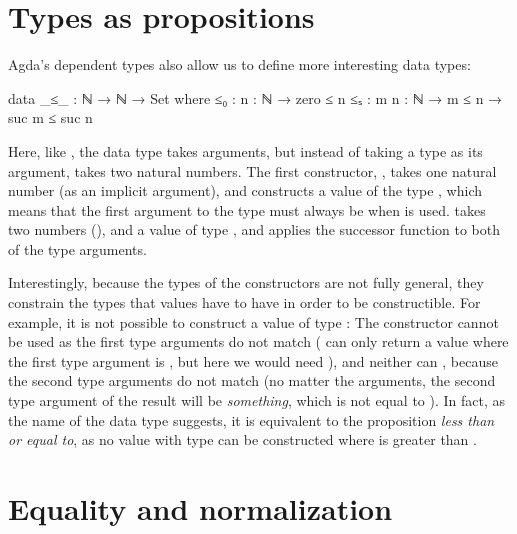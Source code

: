 %

	\section{Types as propositions}

		Agda's dependent types also allow us to define more interesting data
		types:

		\begin{code}
			data _≤_ : ℕ → ℕ → Set where
			  ≤₀  : {n : ℕ} → zero ≤ n
			  ≤ₛ  : {m n : ℕ} → m ≤ n → suc m ≤ suc n
		\end{code}

		Here, like \codett{\_*}, the data type  takes arguments,
		but instead of taking a type as its argument,  takes two
		natural numbers. The first constructor, , takes one natural
		number  (as an implicit argument), and constructs a value of
		the type , which means that the first argument to the
		type must always be  when  is used. 
		takes two numbers (), and a value of type ,
		and applies the successor function to both of the type arguments.

		Interestingly, because the types of the constructors are not fully
		general, they constrain the types that values have to have in order to
		be constructible. For example, it is not possible to construct a value
		of type : The constructor  cannot be
		used as the first type arguments do not match ( can only
		return a value where the first type argument is , but here
		we would need ), and neither can , because
		the second type arguments do not match (no matter the arguments, the
		second type argument of the result will be 
		\emph{something}, which is not equal to ). In fact, as the
		name of the data type suggests, it is equivalent to the proposition
		\emph{less than or equal to}, as no value with type  can
		be constructed where  is greater than .

	\section{Equality and normalization}

